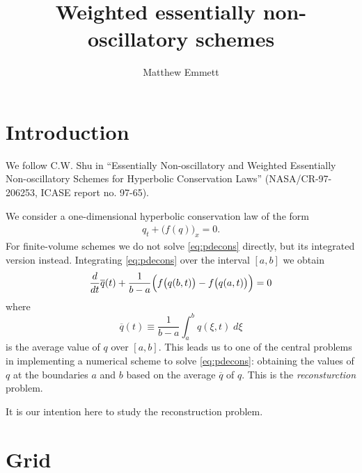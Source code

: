\documentclass{article}
\newcommand{\dd}[2]{\frac{d #1}{d #2}}
\numberwithin{equation}{section}
\begin{document}
\title{Weighted essentially non-oscillatory schemes}
\author{Matthew Emmett}
\maketitle


\section{Introduction}

We follow C.W. Shu in ``Essentially Non-oscillatory and Weighted
Essentially Non-oscillatory Schemes for Hyperbolic Conservation Laws''
(NASA/CR-97-206253, ICASE report no. 97-65).

We consider a one-dimensional hyperbolic conservation law of the form
\begin{gather}
  \label{eq:pdecons}
  q_t + \bigl( f(q) \bigr)_x = 0.
\end{gather}
For finite-volume schemes we do not solve \eqref{eq:pdecons} directly,
but its integrated version instead.  Integrating \eqref{eq:pdecons}
over the interval $[a,b]$ we obtain
\begin{equation*}
  \dd{}{t} \overline{q}(t)
    + \frac{1}{b - a} \Bigl( f\bigl(q(b,t)\bigr)
                                - f\bigl(q(a,t)\bigr) \Bigr) = 0
\end{equation*}
where
\begin{equation*}
  \overline{q}(t)
    \equiv \frac{1}{b - a} \int_{a}^{b} q(\xi,t) \;d\xi
\end{equation*}
is the average value of $q$ over $[a,b]$.  This leads us to one of
the central problems in implementing a numerical scheme to solve
\eqref{eq:pdecons}: obtaining the values of $q$ at the boundaries $a$
and $b$ based on the average $\overline{q}$ of $q$.  This is the
\emph{reconsturction} problem.

It is our intention here to study the reconstruction problem.

\newpage
\section{Grid}
\end{document}
